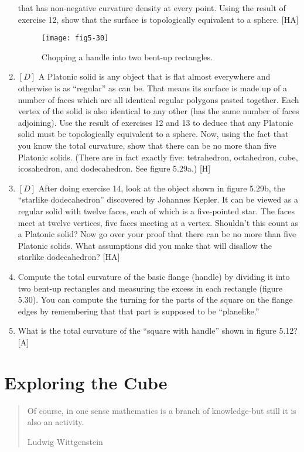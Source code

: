 \documentclass{book}
\begin{document}
\begin{enumerate}
that has non-negative curvature density at every point. Using the result
of exercise 12, show that the surface is topologically equivalent to a
sphere. [HA]
\begin{figure}
\begin{center}
\texttt{[image: fig5-30]}
\caption{Chopping a handle into two bent-up rectangles.}
\end{center}
\end{figure}
\item $[D]$ A Platonic solid is any object that is flat almost everywhere
and otherwise is as ``regular'' as can be. That means its surface is made
up of a number of faces which are all identical regular polygons pasted
together. Each vertex of the solid is also identical to any other (has
the same number of faces adjoining). Use the result of exercises 12 and
13 to deduce that any Platonic solid must be topologically equivalent
to a sphere. Now, using the fact that you know the total curvature,
show that there can be no more than five Platonic solids. (There are
in fact exactly five: tetrahedron, octahedron, cube, icosahedron, and
dodecahedron. See figure 5.29a.) [H]
\item $[D]$ After doing exercise 14, look at the object shown in figure 5.29b,
the ``starlike dodecahedron'' discovered by Johannes Kepler. It can be
viewed as a regular solid with twelve faces, each of which is a five-pointed
star. The faces meet at twelve vertices, five faces meeting at a vertex.
Shouldn't this count as a Platonic solid? Now go over your proof that
there can be no more than five Platonic solids. What assumptions did
you make that will disallow the starlike dodecahedron? [HA]
\item Compute the total curvature of the basic flange (handle) by dividing
it into two bent-up rectangles and measuring the excess in each rectangle
(figure 5.30). You can compute the turning for the parts of the square
on the flange edges by remembering that that part is supposed to be
``planelike.''
\item What is the total curvature of the ``square with handle'' shown in
figure 5.12? [A]
\end{enumerate}

\chapter{Exploring the Cube}
\begin{quote}
Of course, in one sense mathematics is a branch of
knowledge-but still it is also an activity.

Ludwig Wittgenstein
\end{quote}
\end{document}
